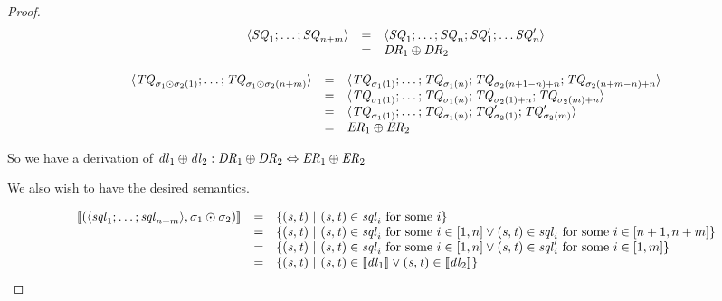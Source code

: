 \documentclass[numbers]{sigplanconf}
\begin{document}
\begin{proof}
  \[
    \begin{array}{rcl}
      \langle\mathit{SQ}_1;\ldots;\mathit{SQ}_{n+m}\rangle
      & = & \langle\mathit{SQ}_1;\ldots;\mathit{SQ}_n;
            \mathit{SQ}_1';\ldots\mathit{SQ}_n'\rangle\\
      & = & \mathit{DR}_1\oplus\mathit{DR}_2
    \end{array}
  \]


  \[
    \begin{array}{rcl}
      \langle\mathit{TQ}_{\sigma_1\odot\sigma_2(1)};\ldots;
      \mathit{TQ}_{\sigma_1\odot\sigma_2(n+m)}\rangle
      & = & \langle\mathit{TQ}_{\sigma_1(1)};\ldots;\mathit{TQ}_{\sigma_1(n)};
            \mathit{TQ}_{\sigma_2(n+1-n)+n};\mathit{TQ}_{\sigma_2(n+m-n)+n}\rangle\\
      & = & \langle\mathit{TQ}_{\sigma_1(1)};\ldots;\mathit{TQ}_{\sigma_1(n)};
            \mathit{TQ}_{\sigma_2(1)+n};\mathit{TQ}_{\sigma_2(m)+n}\rangle\\
      & = & \langle\mathit{TQ}_{\sigma_1(1)};\ldots;\mathit{TQ}_{\sigma_1(n)};
            \mathit{TQ}_{\sigma_2(1)}';\mathit{TQ}_{\sigma_2(m)}'\rangle\\
      & = & \mathit{ER}_1\oplus\mathit{ER}_2
    \end{array}
  \]

  So we have a derivation of $\mathit{dl}_1\oplus\mathit{dl}_2 :
  \mathit{DR}_1\oplus\mathit{DR}_2 \Leftrightarrow
  \mathit{ER}_1\oplus\mathit{ER}_2$
  
  We also wish to have the desired semantics.

  \[
    \begin{array}{rcl}
      [ \! [(\langle\mathit{sql}_1;\ldots;\mathit{sql}_{n+m}\rangle,
      \sigma_1\odot\sigma_2)] \! ]
      & = & \{(\mathit{s},\mathit{t})~|~
            (\mathit{s},\mathit{t})\in\mathit{sql}_i\text{ for some $i$}\}\\
      & = & \{(\mathit{s},\mathit{t})~|~
            (\mathit{s},\mathit{t})\in\mathit{sql}_i
            \text{ for some $i\in[1,n]$} \vee
            (\mathit{s},\mathit{t})\in\mathit{sql}_i
            \text{ for some $i\in[n+1,n+m]$}\}\\
      & = & \{(\mathit{s},\mathit{t})~|~
            (\mathit{s},\mathit{t})\in\mathit{sql}_i
            \text{ for some $i\in[1,n]$} \vee
            (\mathit{s},\mathit{t})\in\mathit{sql}_i'
            \text{ for some $i\in[1,m]$}\}\\
      & = & \{(\mathit{s},\mathit{t}) ~|~
            (\mathit{s},\mathit{t})\in[ \! [\mathit{dl}_1] \! ]
            \vee(\mathit{s},\mathit{t})\in[ \! [\mathit{dl}_2] \! ]\}
    \end{array}
  \]

\end{proof}
\end{document}
